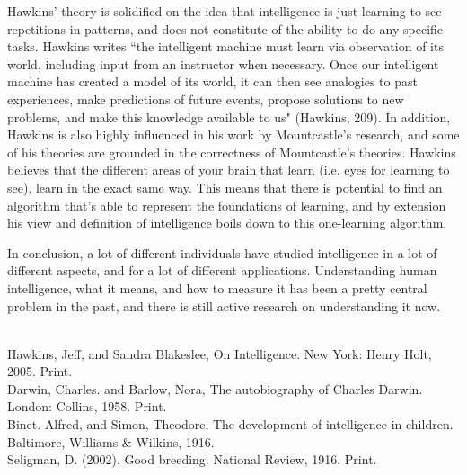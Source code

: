 \documentclass[11pt, oneside]{article}
\begin{document}
\par Hawkins' theory is solidified on the idea that intelligence is just learning to see repetitions in patterns, and does not constitute of the ability to do any specific tasks. Hawkins writes ``the intelligent machine must learn via observation of its world, including input from an instructor when necessary. Once our intelligent machine has created a model of its world, it can then see analogies to past experiences, make predictions of future events, propose solutions to new problems, and make this knowledge available to us" (Hawkins, 209). In addition, Hawkins is also highly influenced in his work by Mountcastle's research, and some of his theories are grounded in the correctness of Mountcastle's theories. Hawkins believes that the different areas of your brain that learn (i.e. eyes for learning to see), learn in the exact same way. This means that there is potential to find an algorithm that's able to represent the foundations of learning, and by extension his view and definition of intelligence boils down to this one-learning algorithm.

\par In conclusion, a lot of different individuals have studied intelligence in a lot of different aspects, and for a lot of different applications. Understanding human intelligence, what it means, and how to measure it has been a pretty central problem in the past, and there is still active research on understanding it now.

\noindent 

\begin{workscited}
\bibent \\
\bibent Hawkins, Jeff, and Sandra Blakeslee, On Intelligence. New York: Henry Holt, 2005. Print. \\
\bibent Darwin, Charles. and Barlow, Nora, The autobiography of Charles Darwin. London: Collins, 1958. Print. \\
\bibent Binet. Alfred, and Simon, Theodore, The development of intelligence in children. Baltimore, Williams \& Wilkins, 1916. \\
\bibent Seligman, D. (2002). Good breeding. National Review, 1916.
Print. \\
\end{workscited}
\end{document}
